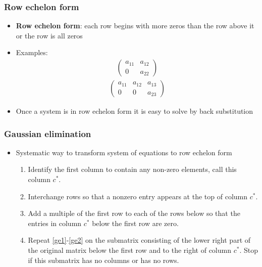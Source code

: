 \documentclass[compress]{beamer}
\begin{document}
\begin{frame}
  \frametitle{Row echelon form}
  \begin{itemize}
  \item \textbf{Row echelon form}: each row begins with more zeros
    than the row above it or the row is all zeros
  \item Examples: 
    \begin{align*}
      \begin{pmatrix} 
        a_{11} & a_{12} \\
        0     & a_{22}
      \end{pmatrix}
    \end{align*}
    \begin{align*}
      \begin{pmatrix}
        a_{11} & a_{12} & a_{13} \\
        0     & 0     & a_{23} 
      \end{pmatrix}
    \end{align*}
  \item Once a system is in row echelon form it is easy to solve by
    back substitution
  \end{itemize}
\end{frame}

\begin{frame}
  \frametitle{Gaussian elimination}
  \begin{itemize}
  \item Systematic way to transform system of equations to row echelon
    form
    \begin{enumerate}
    \item\label{ge1} Identify the first column to contain any non-zero
      elements, call this column $c^*$.
    \item\label{ge2} Interchange rows so that a nonzero entry appears at
      the top of column $c^*$. 
    \item\label{ge3} Add a multiple of the first row to each of the rows
      below so that the entries in column $c^*$ below the first row are
      zero.
    \item\label{ge4} Repeat \ref{ge1}-\ref{ge2} on the submatrix
      consisting of the lower right part of the original matrix below the
      first row and to the right of column $c^*$. Stop if this submatrix
      has no columns or has no rows.
    \end{enumerate}
  \end{itemize}
\end{frame}
\end{document}
